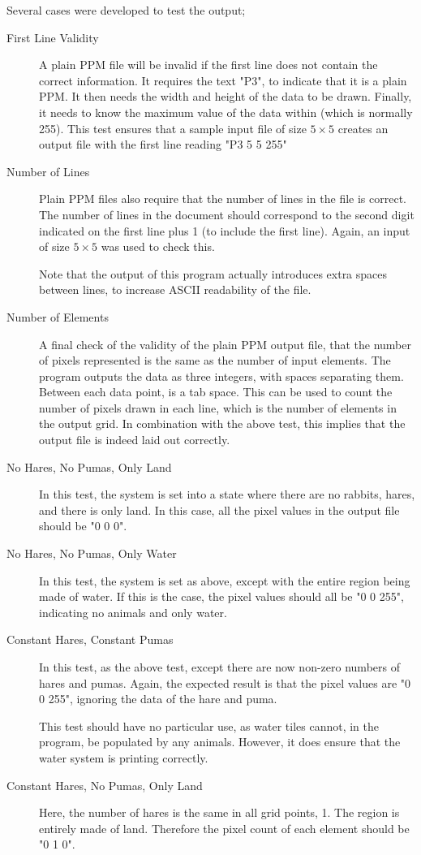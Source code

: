 	Several cases were developed to test the output;
	\begin{description}
		\item[First Line Validity]
			A plain PPM file will be invalid if the first line does not contain the correct information.
			It requires the text "P3", to indicate that it is a plain PPM.
			It then needs the width and height of the data to be drawn.
			Finally, it needs to know the maximum value of the data within (which is normally 255).
			This test ensures that a sample input file of size $5\times5$ creates an output file with the first line reading "P3 5 5 255"
		\item[Number of Lines]
			Plain PPM files also require that the number of lines in the file is correct. 
			The number of lines in the document should correspond to the second digit indicated on the first line plus 1 (to include the first line).
			Again, an input of size $5\times5$ was used to check this.

			Note that the output of this program actually introduces extra spaces between lines, to increase ASCII readability of the file.
		\item[Number of Elements]
			A final check of the validity of the plain PPM output file, that the number of pixels represented is the same as the number of input elements.
			The program outputs the data as three integers, with spaces separating them.
			Between each data point, is a tab space.
			This can be used to count the number of pixels drawn in each line, which is the number of elements in the output grid.
			In combination with the above test, this implies that the output file is indeed laid out correctly.
		\item[No Hares, No Pumas, Only Land]
			In this test, the system is set into a state where there are no rabbits, hares, and there is only land.
			In this case, all the pixel values in the output file should be "0 0 0".
		\item[No Hares, No Pumas, Only Water]
			In this test, the system is set as above, except with the entire region being made of water.
			If this is the case, the pixel values should all be "0 0 255", indicating no animals and only water.
		\item[Constant Hares, Constant Pumas]
			In this test, as the above test, except there are now non-zero numbers of hares and pumas.
			Again, the expected result is that the pixel values are "0 0 255", ignoring the data of the hare and puma.

			This test should have no particular use, as water tiles cannot, in the program, be populated by any animals.
			However, it does ensure that the water system is printing correctly.
		\item[Constant Hares, No Pumas, Only Land]
			Here, the number of hares is the same in all grid points, 1.
			The region is entirely made of land.
			Therefore the pixel count of each element should be "0 1 0".
			

\end{description}
